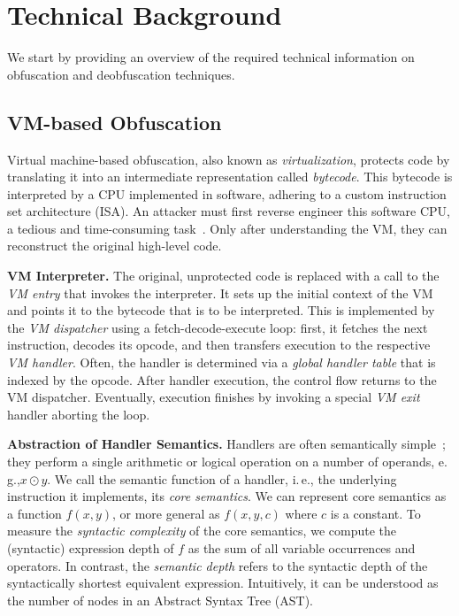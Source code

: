 \documentclass[letterpaper,twocolumn,10pt]{article}
\newcommand{\eg}{e.\,g.,\xspace}
\newcommand{\ie}{i.\,e.,\xspace}
\theoremstyle{customexample}
\theoremstyle{customexperiment}
\begin{document}
 \section{Technical Background}\label{sec:background}

We start by providing an overview of the required technical information on obfuscation and deobfuscation techniques. 

\subsection{VM-based Obfuscation}\label{sec:background:VM}
Virtual machine-based obfuscation, also known as \emph{virtualization}, protects code by translating it into an intermediate representation called \emph{bytecode}. This bytecode is interpreted by a CPU implemented in software, adhering to a custom instruction set architecture (ISA). An attacker must first reverse engineer this software CPU, a tedious and time-consuming task~\cite{rolles2009unpacking,sharif2009automatic}. Only after understanding the VM, they can reconstruct the original high-level code. 

\textbf{VM Interpreter.}
The original, unprotected code is replaced with a call to the \emph{VM entry} that invokes the interpreter. It sets up the initial context of the VM and points it to the bytecode that is to be interpreted. This is implemented by the \emph{VM dispatcher} using a fetch-decode-execute loop: first, it fetches the next instruction, decodes its opcode, and then transfers execution to the respective \emph{VM handler}. Often, the handler is determined via a \emph{global handler table} that is indexed by the opcode. After handler execution, the control flow returns to the VM dispatcher. Eventually, execution finishes by invoking a special \emph{VM exit} handler aborting the loop.

\textbf{Abstraction of Handler Semantics.}\label{paragraph:abstraction_handler_semantics}
Handlers are often semantically simple~\cite{blazytko2017syntia,rolles2009unpacking}; they perform a single arithmetic or logical operation on a number of operands, \eg $x \odot y$. We call the semantic function of a handler, \ie the underlying instruction it implements, its \emph{core semantics}. We can represent core semantics as a function $f(x, y)$, or more general as $f(x, y, c)$ where $c$ is a constant. To measure the \emph{syntactic complexity} of the core semantics, we compute the (syntactic) expression depth of $f$ as the sum of all variable occurrences and operators. In contrast, the \emph{semantic depth} refers to the syntactic depth of the syntactically shortest equivalent expression. Intuitively, it can be understood as the number of nodes in an Abstract Syntax Tree (AST). 
\end{document}
